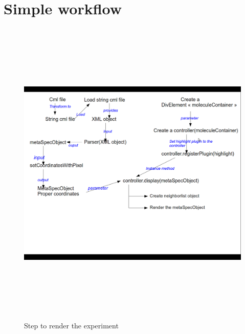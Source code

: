 \section{Simple workflow}
    \begin{figure}[h]
    \begin{centering}
    \caption{Step to render the experiment}
\includegraphics[width=190mm,height=150mm]{./images/workflow1}
    \end{centering}
    \end{figure}
\clearpage
